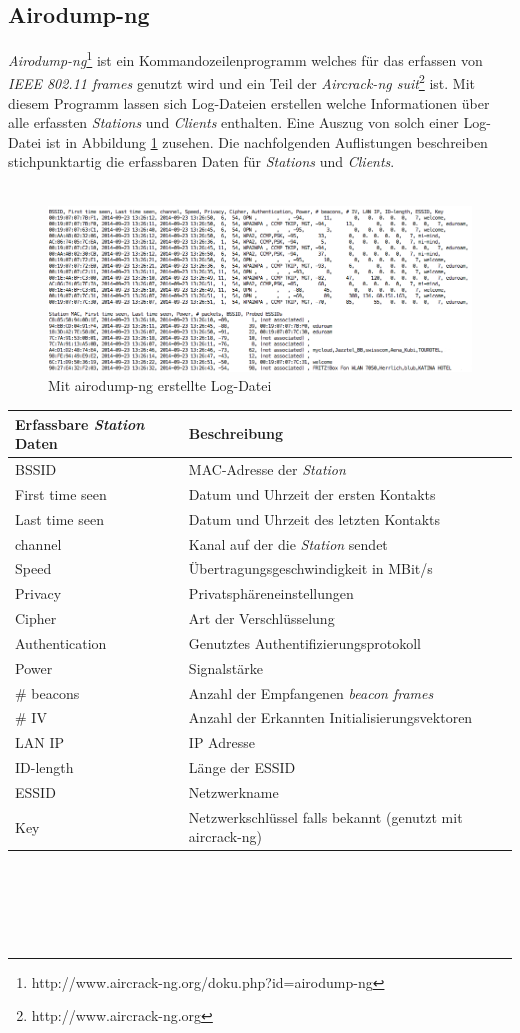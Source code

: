 \documentclass[]{report}
\begin{document}
\subsection{Airodump-ng}\label{airodump-ng}
\textit{Airodump-ng}\footnote{http://www.aircrack-ng.org/doku.php?id=airodump-ng} ist ein Kommandozeilenprogramm welches für das erfassen von \textit{IEEE 802.11 frames} genutzt wird und ein Teil der \textit{Aircrack-ng suit}\footnote{http://www.aircrack-ng.org} ist. Mit diesem Programm lassen sich Log-Dateien erstellen welche Informationen über alle erfassten \textit{Stations} und \textit{Clients} enthalten. Eine Auszug von solch einer Log-Datei ist in Abbildung \ref{fig:log_file} zusehen. Die nachfolgenden Auflistungen beschreiben stichpunktartig die erfassbaren Daten für \textit{Stations} und \textit{Clients}.\\ \\
\begin{figure}
    \centering
    \includegraphics[width=5.0in]{bilder/log.png}
    \caption{Mit airodump-ng erstellte Log-Datei}
    \label{fig:log_file}
\end{figure}
\begin{tabular}{l | l}
\toprule
Erfassbare \textit{Station} Daten & Beschreibung \\
\midrule
BSSID & MAC-Adresse der \textit{Station} \\
First time seen & Datum und Uhrzeit der ersten Kontakts \\
Last time seen & Datum und Uhrzeit des letzten Kontakts \\
channel &  Kanal auf der die \textit{Station} sendet \\
Speed & Übertragungsgeschwindigkeit in MBit/s\\
Privacy & Privatsphäreneinstellungen \\
Cipher & Art der Verschlüsselung \\
Authentication & Genutztes Authentifizierungsprotokoll \\
Power & Signalstärke \\ 
\# beacons & Anzahl der Empfangenen \textit{beacon frames}\\
\# IV & Anzahl der Erkannten Initialisierungsvektoren \\
LAN IP &  IP Adresse \\
ID-length & Länge der ESSID \\
ESSID & Netzwerkname \\
Key & Netzwerkschlüssel falls bekannt (genutzt mit aircrack-ng) \\
\bottomrule
\end{tabular} \\ \\ \\ \\
\end{document}

